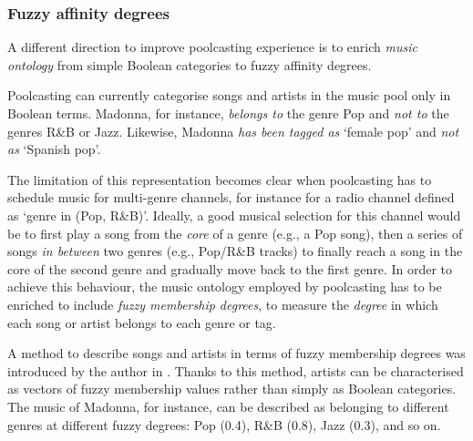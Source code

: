 \subsubsection{Fuzzy affinity degrees} %
\label{ssub:smooth_genre_transitions}

A different direction to improve poolcasting experience is to enrich \emph{music ontology} from simple Boolean categories to fuzzy affinity degrees.

Poolcasting can currently categorise songs and artists in the music pool only in Boolean terms. 
Madonna, for instance, \emph{belongs to} the genre Pop and \emph{not to} the genres R\&B or Jazz. Likewise, Madonna \emph{has been tagged as} `female pop' and \emph{not as} `Spanish pop'.

The limitation of this representation becomes clear when poolcasting has to schedule music for multi-genre channels, for instance for a radio channel defined as `genre in (Pop, R\&B)'.
Ideally, a good musical selection for this channel would be to first play a song from the \emph{core} of a genre (e.g., a Pop song), then a series of songs \emph{in between} two genres (e.g., Pop/R\&B tracks) to finally reach a song in the core of the second genre and gradually move back to the first genre. %
%
%
In order to achieve this behaviour, the music ontology employed by poolcasting has to be enriched to include \emph{fuzzy membership degrees}, to measure the \emph{degree} in which each song or artist belongs to each genre or tag. %

A method to describe songs and artists in terms of fuzzy membership degrees was introduced by the author in \cite{Baccigalupo08}.
Thanks to this method, artists can be characterised as vectors of fuzzy membership values rather than simply as Boolean categories. 
The music of Madonna, for instance, can be described as belonging to different genres at different fuzzy degrees: Pop (0.4), R\&B (0.8), Jazz (0.3), and so on.


